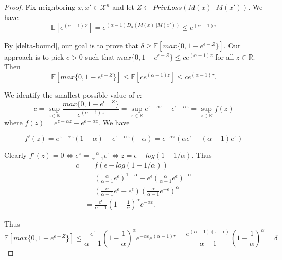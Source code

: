 \begin{proof}
Fix neighboring $x, x' \in  \mathcal{X}^n$ and let $Z \leftarrow PrivLoss(M(x) || M(x'))$. We have
\begin{equation}
    \mathbb{E}[e^{(\alpha - 1) Z}] = e^{(\alpha - 1)D_\alpha(M(x) || M(x'))} \leq e^{(\alpha - 1)\tau}
\end{equation}

By \ref{delta-bound}, our goal is to prove that $\delta \geq \mathbb{E}[max\{0, 1 - e^{\epsilon - Z} \}]$. 
Our approach is to pick $c > 0$ such that $max\{0, 1 - e^{\epsilon - Z} \} \leq c e^{(\alpha - 1) z}$ for all $z \in \mathbb{R}$. Then
\begin{equation}
    \mathbb{E}[max\{0, 1 - e^{\epsilon - Z} \}] \leq \mathbb{E}[c e^{(\alpha - 1) z}] \leq c e^{(\alpha - 1) \tau}.
\end{equation}

We identify the smallest possible value of $c$:
\begin{equation}
    c = \sup\limits_{z \in \mathbb{R}} \frac{max\{0, 1 - e^{\epsilon - Z} \}}{e^{(\alpha -1)z}} 
    = \sup\limits_{z \in \mathbb{R}} e^{z - \alpha z} - e^{\epsilon - \alpha z} 
    = \sup\limits_{z \in \mathbb{R}}f(z)
\end{equation}
where $f(z) = e^{z - \alpha z} - e^{\epsilon - \alpha z}$. We have 

\begin{equation}
    f'(z) = e^{z - \alpha z} (1 - \alpha) - e^{\epsilon - \alpha z}(-\alpha) 
    = e^{-\alpha z} (\alpha e^\epsilon - (\alpha - 1) e^z)
\end{equation}

Clearly $f'(z) = 0 \Longleftrightarrow e^z = \frac{\alpha}{\alpha - 1}e^{\epsilon} \Longleftrightarrow z = \epsilon - log(1 - 1/\alpha)$. Thus
\begin{align}
    c &= f(\epsilon - log(1 - 1 / \alpha)) \\
    &= \left(\frac{\alpha}{\alpha - 1} e^\epsilon \right)^{1 - \alpha} - e^{\epsilon} \left(\frac{\alpha}{\alpha - 1} e^\epsilon \right)^{- \alpha} \\
    &= \left(\frac{\alpha}{\alpha - 1} e^\epsilon  - e^\epsilon \right)  \left(\frac{\alpha}{\alpha - 1} e^{-\epsilon} \right)^{\alpha} \\
    &= \frac{e^\epsilon}{\alpha - 1} \left(1 - \frac{1}{\alpha} \right)^\alpha  e^{-\alpha \epsilon}.
\end{align}

Thus
\begin{equation}
    \mathbb{E}[max\{0, 1 - e^{\epsilon - Z}\}] \leq \frac{e^\epsilon}{\alpha - 1}\left(1  - \frac{1}{\alpha} \right) ^\alpha e^{-\alpha \epsilon} e^{(\alpha -1)\tau}
    = \frac{e^{(\alpha - 1)(\tau - \epsilon)}}{\alpha - 1} \left( 1 - \frac{1}{\alpha} \right)^\alpha
    = \delta
\end{equation}

\end{proof}


